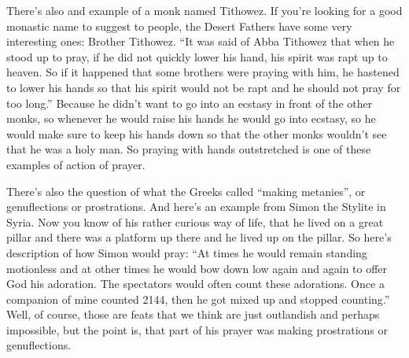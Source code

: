 There's also and example of a monk named Tithowez. If you're looking for a good monastic name to suggest to people, the Desert Fathers have some very interesting ones: Brother Tithowez. ``It was said of Abba Tithowez that when he stood up to pray, if he did not quickly lower his hand, his spirit was rapt up to heaven. So if it happened that some brothers were praying with him, he hastened to lower his hands so that his spirit would not be rapt and he should not pray for too long.'' Because he didn't want to go into an ecstasy in front of the other monks, so whenever he would raise his hands he would go into ecstasy, so he would make sure to keep his hands down so that  the other monks wouldn't see that he was a holy man. So praying with hands outstretched is one of these examples of action of prayer.

There's also the question of what the Greeks called ``making metanies'', or genuflections or prostrations. And here's an example from Simon the Stylite in Syria. Now you know of his rather curious way of life, that he lived on a great pillar and there was a platform up there and he lived up on the pillar. So here's description of how Simon would pray: ``At times he would remain standing motionless and at other times he would bow down low again and again to offer God his adoration. The spectators would often count these adorations. Once a companion of mine counted 2144, then he got mixed up and stopped counting.'' Well, of course, those are feats that we think are just outlandish and perhaps impossible, but the point is, that part of his prayer was making prostrations or genuflections.

